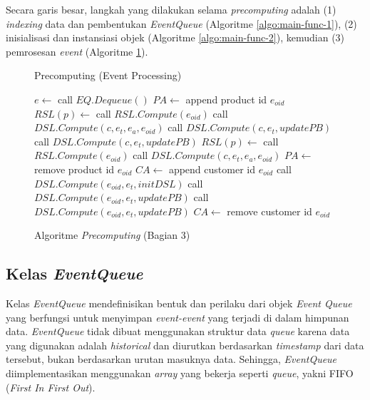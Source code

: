 Secara garis besar, langkah yang dilakukan selama \textit{precomputing} adalah (1) \textit{indexing} data dan pembentukan \textit{EventQueue} (Algoritme \ref{algo:main-func-1}), (2) inisialisasi dan instansiasi objek (Algoritme \ref{algo:main-func-2}), kemudian (3) pemrosesan \textit{event} (Algoritme \ref{algo:main-func-3}).

\begin{figure}[H]
	\begin{algorithm}[H]
		\caption{Precomputing (Event Processing)}
		\begin{algorithmic}[1]
				\State $e \leftarrow$ call $EQ.Dequeue()$
					  
						\State $PA \leftarrow$ append product id $e_{oid}$
						\State $RSL(p) \leftarrow $ call $RSL.Compute(e_{oid})$
							\State call $DSL.Compute(c, e_t, e_a, e_{oid})$
						\EndFor
							\State call $DSL.Compute(c, e_t, updatePB)$
						\EndFor
					 
							\State call $DSL.Compute(c, e_t, updatePB)$
						\EndFor
						\State $RSL(p) \leftarrow $ call $RSL.Compute(e_{oid})$
							\State call $DSL.Compute(c, e_t, e_a, e_{oid})$
						\EndFor
						\State $PA \leftarrow$ remove product id $e_{oid}$
					\EndIf
					 
						\State $CA \leftarrow$ append customer id $e_{oid}$ 
						\State call $DSL.Compute(e_{oid}, e_t, initDSL)$
						\State call $DSL.Compute(e_{oid}, e_t, updatePB)$
					 
						\State call $DSL.Compute(e_{oid}, e_t, updatePB)$
						\State $CA \leftarrow$ remove customer id $e_{oid}$ 
					\EndIf
				\EndIf
			\EndWhile
		\end{algorithmic}
	\end{algorithm}
	\caption{Algoritme \textit{Precomputing} (Bagian 3) \label{algo:main-func-3}}
\end{figure}

\subsection{Kelas \textit{EventQueue}}
\tab Kelas \textit{EventQueue} mendefinisikan bentuk dan perilaku dari objek \textit{Event Queue} yang berfungsi untuk menyimpan \textit{event-event} yang terjadi di dalam himpunan data. \textit{EventQueue} tidak dibuat menggunakan struktur data \textit{queue} karena data yang digunakan adalah \textit{historical} dan diurutkan berdasarkan \textit{timestamp} dari data tersebut, bukan berdasarkan urutan masuknya data. Sehingga, \textit{EventQueue} diimplementasikan menggunakan \textit{array} yang bekerja seperti \textit{queue}, yakni FIFO (\textit{First In First Out}). 


